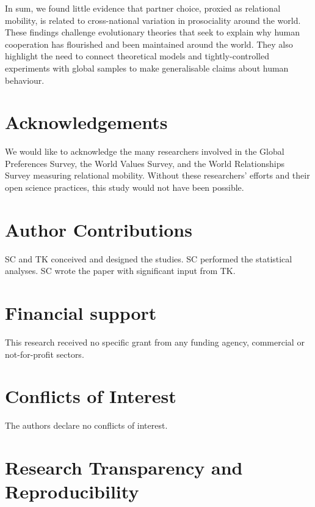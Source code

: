 \documentclass[english,man,floatsintext]{apa6}
\begin{document}
In sum, we found little evidence that partner choice, proxied as relational mobility, is related to cross-national variation in prosociality around the world. These findings challenge evolutionary theories that seek to explain why human cooperation has flourished and been maintained around the world. They also highlight the need to connect theoretical models and tightly-controlled experiments with global samples to make generalisable claims about human behaviour.

\newpage

\hypertarget{acknowledgements}{%
\section{Acknowledgements}\label{acknowledgements}}

We would like to acknowledge the many researchers involved in the Global Preferences Survey, the World Values Survey, and the World Relationships Survey measuring relational mobility. Without these researchers' efforts and their open science practices, this study would not have been possible.

\hypertarget{author-contributions}{%
\section{Author Contributions}\label{author-contributions}}

SC and TK conceived and designed the studies. SC performed the statistical analyses. SC wrote the paper with significant input from TK.

\hypertarget{financial-support}{%
\section{Financial support}\label{financial-support}}

This research received no specific grant from any funding agency, commercial or not-for-profit sectors.

\hypertarget{conflicts-of-interest}{%
\section{Conflicts of Interest}\label{conflicts-of-interest}}

The authors declare no conflicts of interest.

\hypertarget{research-transparency-and-reproducibility}{%
\section{Research Transparency and Reproducibility}\label{research-transparency-and-reproducibility}}
\end{document}
